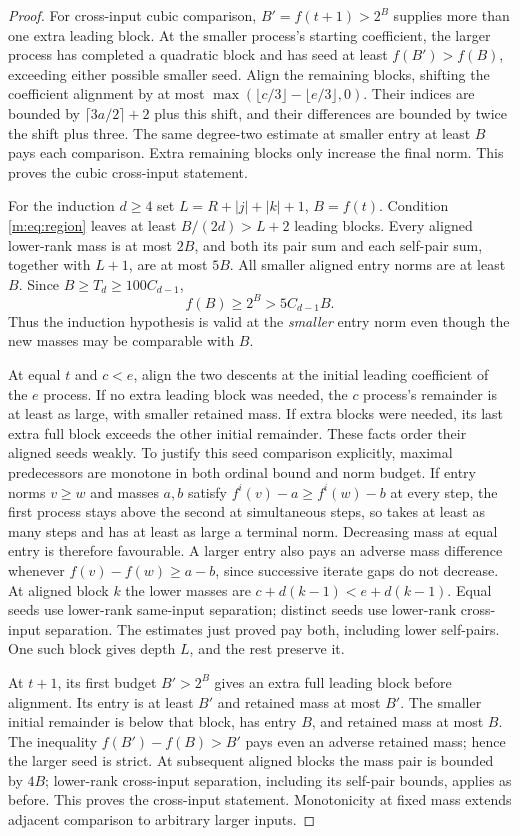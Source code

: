 \begin{proof}
For cross-input cubic comparison, $B'=f(t+1)>2^B$ supplies more than one
extra leading block. At the smaller process's starting coefficient,
the larger process has completed a quadratic block and has seed at least
$f(B')>f(B)$, exceeding either possible smaller seed. Align the remaining
blocks, shifting the coefficient alignment by at most
$\max(\lfloor c/3\rfloor-\lfloor e/3\rfloor,0)$. Their indices are bounded
by $\lceil3a/2\rceil+2$ plus this shift, and their differences are bounded
by twice the shift plus three. The same degree-two estimate at smaller
entry at least $B$ pays each comparison. Extra remaining blocks only
increase the final norm. This proves the cubic cross-input statement.

For the induction $d\ge4$ set $L=R+|j|+|k|+1$, $B=f(t)$.
Condition \eqref{m:eq:region} leaves at least $B/(2d)>L+2$ leading
blocks. Every aligned lower-rank mass is at most $2B$, and both its pair
sum and each self-pair sum, together with $L+1$, are at most $5B$.
All smaller aligned entry norms are at least $B$. Since
$B\ge T_d\ge100C_{d-1}$,
\[
 f(B)\ge2^B>5C_{d-1}B.
\]
Thus the induction hypothesis is valid at the \emph{smaller} entry norm
even though the new masses may be comparable with $B$.

At equal $t$ and $c<e$, align the two descents at the initial leading
coefficient of the $e$ process. If no extra leading block was needed,
the $c$ process's remainder is at least as large, with smaller retained
mass. If extra blocks were needed, its last extra full block exceeds the
other initial remainder. These facts order their aligned seeds weakly.
To justify this seed comparison explicitly, maximal predecessors are
monotone in both ordinal bound and norm budget. If entry norms $v\ge w$
and masses $a,b$ satisfy
$f^i(v)-a\ge f^i(w)-b$ at every step, the first process stays above the
second at simultaneous steps, so takes at least as many steps and has at
least as large a terminal norm. Decreasing mass at equal entry is therefore
favourable. A larger entry also pays an adverse mass difference whenever
$f(v)-f(w)\ge a-b$, since successive iterate gaps do not decrease.
At aligned block $k$ the lower masses are $c+d(k-1)<e+d(k-1)$.
Equal seeds use lower-rank same-input separation; distinct seeds use
lower-rank cross-input separation. The estimates just proved pay both,
including lower self-pairs. One such block gives depth $L$, and the rest
preserve it.

At $t+1$, its first budget $B'>2^B$ gives an extra full leading block
before alignment. Its entry is at least $B'$ and retained mass at most
$B'$. The smaller initial remainder is below that block, has entry $B$,
and retained mass at most $B$. The inequality
$f(B')-f(B)>B'$ pays even an adverse retained mass; hence the larger seed
is strict. At subsequent aligned blocks the mass pair is bounded by
$4B$; lower-rank cross-input separation, including its self-pair bounds,
applies as before. This proves the cross-input statement. Monotonicity
at fixed mass extends adjacent comparison to arbitrary larger inputs.


\end{proof}
